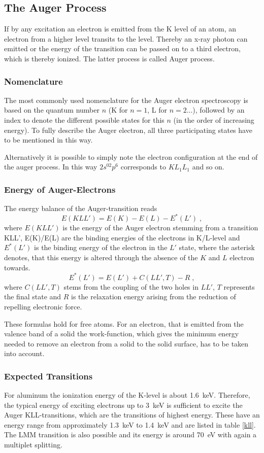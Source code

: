 \documentclass[a4paper]{scrartcl}
\numberwithin{equation}{section}
\numberwithin{figure}{section}
\numberwithin{table}{section}
\newcommand{\eq}[2]{\begin{equation}#1\label{#2}\end{equation}}
\begin{document}
\subsection{The Auger Process}
If by any excitation an electron is emitted from the K level of an atom, an electron from a higher level transits to the level. Thereby an x-ray photon can emitted or the energy of the transition can be passed on to a third electron, which is thereby ionized. The latter process is called Auger process.
\subsubsection*{Nomenclature}
The most commonly used nomenclature for the Auger electron spectroscopy is based on the quantum number $n$ (K for $n=1$, L for $n=2$...), followed by an index to denote the different possible states for this $n$ (in the order of increasing energy). To fully describe the Auger electron, all three participating states have to be mentioned in this way. 

Alternatively it is possible to simply note the electron configuration at the end of the auger process. In this way $2s^02p^6$ corresponds to $KL_1L_1$ and so on.




\subsubsection*{Energy of Auger-Electrons}
The energy balance of the Auger-transition reads
\eq{E(KLL') = E(K) -E(L) - E^{*}(L') \; ,}{EKLL}
where $E(KLL')$ is the energy of the Auger electron stemming from a transition KLL', E(K)/E(L) are the binding energies of the electrons in K/L-level and $E^*(L')$ is the binding energy of the electron in the $L'$ state, where the asterisk denotes, that this energy is altered through the absence of the $K$ and $L$ electron towards.
\eq{E^*(L') = E(L') + C(LL',T) -R \; ,}{E*}
where $C(LL',T)$ stems from the coupling of the two holes in $LL'$, $T$ represents the final state and $R$ is the relaxation energy arising from the reduction of repelling electronic force. 

These formulas hold for free atoms. For an electron, that is emitted from the valence band of a solid the work-function, which gives the minimum energy needed to remove an electron from a solid to the solid surface, has to be taken into account.


\subsubsection*{Expected Transitions}
For aluminum the ionization energy of the K-level is about \SI{1,6}{keV}. Therefore, the typical energy of exciting electrons up to \SI{3}{keV} is sufficient to excite the Auger KLL-transitions, which are the transitions of highest energy. These have an energy range from approximately \SI{1,3}{keV} to \SI{1,4}{keV} and are listed in table \ref{kll}. The LMM transition is also possible and its energy is around \SI{70}{eV} with again a multiplet splitting.
\end{document}
